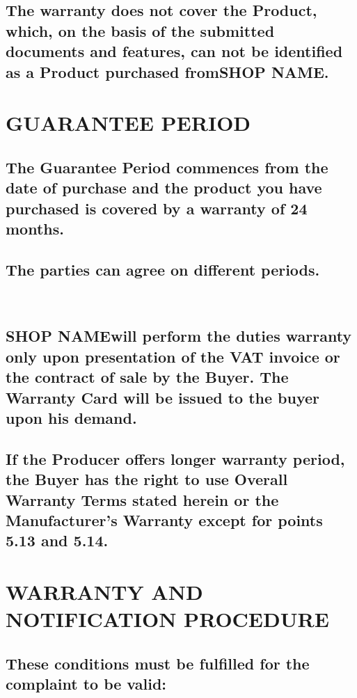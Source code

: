 \documentclass[10pt,a4paper]{article}
\newcommand{\shopname}{SHOP NAME}
\begin{document}
\subsection{The warranty does not cover the Product, which, on the basis of the submitted documents and features, can not be identified as a Product purchased from\shopname.}

\section{GUARANTEE PERIOD}   

\subsection{The Guarantee Period commences from the date of purchase and the product you have purchased is covered by a warranty of 24  months.}
\subsection{The parties can agree on different periods.} 
\subsection{\shopname will perform the duties warranty only upon presentation of the VAT invoice  or the contract of sale by the Buyer.
The Warranty Card will be issued  to the buyer upon his demand.} 
\subsection{If the Producer offers  longer warranty period, the Buyer has the right to use Overall Warranty Terms stated herein or the Manufacturer’s Warranty except for points 5.13 and 5.14.}

\section{WARRANTY AND NOTIFICATION PROCEDURE}

\subsection{These conditions must be fulfilled for the complaint to be valid:}
\end{document}
